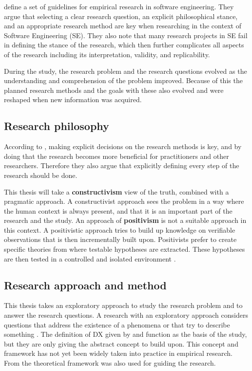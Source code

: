 \documentclass[english, 12pt, a4paper, sci, utf8, a-1b, online]{aaltothesis}
\begin{document}
\textcite{easterbrook2008selecting} define a set of guidelines for empirical research in software engineering. They argue that selecting a clear research question, an explicit philosophical stance, and an appropriate research method are key when researching in the context of Software Engineering (SE). They also note that many research projects in SE fail in defining the stance of the research, which then further complicates all aspects of the research including its interpretation, validity, and replicability.

During the study, the research problem and the research questions evolved as the understanding and comprehension of the problem improved. Because of this the planned research methods and the goals with these also evolved and were reshaped when new information was acquired.

\subsection{Research philosophy} \label{section:research-philosophy}

According to \textcite{easterbrook2008selecting}, making explicit decisions on the research methods is key, and by doing that the research becomes more beneficial for practitioners and other researchers. Therefore they also argue that explicitly defining every step of the research should be done.

This thesis will take a \textbf{constructivism} view of the truth, combined with a pragmatic approach. A constructivist approach sees the problem in a way where the human context is always present, and that it is an important part of the research and the study. An approach of \textbf{positivism} is not a suitable approach in this context. A positivistic approach tries to build up knowledge on verifiable observations that is then incrementally built upon. Positivists prefer to create specific theories from where testable hypotheses are extracted. These hypotheses are then tested in a controlled and isolated environment \parencite{easterbrook2008selecting}.

\subsection{Research approach and method}

This thesis takes an exploratory approach to study the research problem and to answer the research questions. A research with an exploratory approach considers questions that address the existence of a phenomena or that try to describe something \parencite{easterbrook2008selecting}. The definition of DX given by \textcite{fagerholm-dx-concept-and-definition} and \textcite{fagerholm-doctoral-thesis} function as the basis of the study, but they are only giving the abstract concept to build upon. This concept and framework has not yet been widely taken into practice in empirical research. From \textcite{fagerholm-doctoral-thesis} the theoretical framework was also used for guiding the research.
\end{document}
